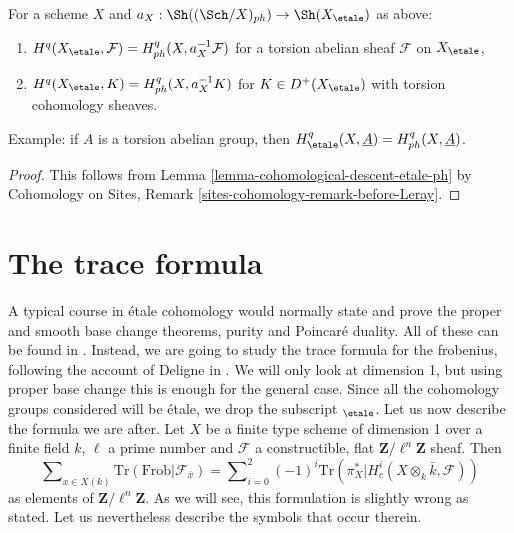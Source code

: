 \begin{lemma}
\label{lemma-compare-cohomology-etale-ph}
For a scheme $X$ and $a_X : \Sh((\Sch/X)_{ph}) \to \Sh(X_\etale)$
as above:
\begin{enumerate}
\item $H^q(X_\etale, \mathcal{F}) = H^q_{ph}(X, a_X^{-1}\mathcal{F})$
for a torsion abelian sheaf $\mathcal{F}$ on $X_\etale$,
\item $H^q(X_\etale, K) = H^q_{ph}(X, a_X^{-1}K)$
for $K \in D^+(X_\etale)$ with torsion cohomology sheaves.
\end{enumerate}
Example: if $A$ is a torsion abelian group, then
$H^q_\etale(X, \underline{A}) = H^q_{ph}(X, \underline{A})$.
\end{lemma}

\begin{proof}
This follows from Lemma \ref{lemma-cohomological-descent-etale-ph}
by Cohomology on Sites, Remark \ref{sites-cohomology-remark-before-Leray}.
\end{proof}












\section{The trace formula}
\label{section-trace-formula}

\noindent
A typical course in \'etale cohomology would normally state and prove the
proper and smooth base change theorems, purity and Poincar\'e duality. All of
these can be found in \cite[Arcata]{SGA4.5}. Instead, we are going to study the
trace formula for the frobenius, following the account of Deligne in
\cite[Rapport]{SGA4.5}. We will only look at dimension 1, but using proper base
change this is enough for the general case. Since all the cohomology groups
considered will be \'etale, we drop the subscript $_\etale$. Let us
now describe
the formula we are after. Let $X$ be a finite type scheme of dimension 1 over a
finite field $k$, $\ell$ a prime number and $\mathcal{F}$ a constructible, flat
$\mathbf{Z}/\ell^n\mathbf{Z}$ sheaf. Then
\begin{equation}
\label{equation-trace-formula-initial}
\sum\nolimits_{x \in X(k)}
\text{Tr}(\text{Frob} | \mathcal{F}_{\bar x}) =
\sum\nolimits_{i = 0}^2
(-1)^i \text{Tr}(\pi_X^* | H^i_c(X \otimes_k \bar k, \mathcal{F}))
\end{equation}
as elements of $\mathbf{Z}/\ell^n\mathbf{Z}$. As we will see, this formulation
is slightly wrong as stated. Let us nevertheless describe the symbols that
occur therein.




